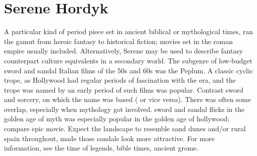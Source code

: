 \documentclass[12pt]{book}
\begin{document}
\chapter{Serene Hordyk}

A particular kind of period piece set in ancient biblical or mythological times, ran the gamut from heroic fantasy to historical fiction; movies set in the roman empire usually included. Alternatively, Serene may be used to describe fantasy counterpart culture equivalents in a secondary world. The subgenre of low-budget sword and sandal Italian films of the 50s and 60s was the Peplum. A classic cyclic trope, as Hollywood had regular periods of fascination with the era, and the trope was named by an early period of such films was popular. Contrast sword and sorcery, on which the name was based ( or vice versa). There was often some overlap, especially when mythology got involved. sword and sandal flicks in the golden age of myth was especially popular in the golden age of hollywood; compare epic movie. Expect the landscape to resemble sand dunes and/or rural spain throughout, made those sandals look more attractive. For more information, see the time of legends, bible times, ancient grome.
\end{document}
